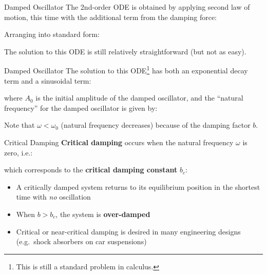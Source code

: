 \documentclass[12pt,compress,aspectratio=169]{beamer}
\begin{document}
\begin{frame}{Damped Oscillator}
  The 2nd-order ODE is obtained by applying second law of motion, this time
  with the additional term from the damping force:


  Arranging into standard form:
  

  The solution to this ODE is still relatively straightforward (but not as
  easy).
\end{frame}



\begin{frame}{Damped Oscillator}
  The solution to this ODE\footnote{This is still a standard problem in
    calculus.} has both an {\color{red}exponential decay term} and a
  {\color{blue}sinusoidal term}:


  \vspace{-.1in}where $A_0$ is the initial amplitude of the damped oscillator,
  and the ``natural frequency'' for the damped oscillator is given by:

  
  Note that $\omega<\omega_0$ (natural frequency decreases) because of the
  damping factor $b$.
  \vspace{.2in}
\end{frame}



\begin{frame}{Critical Damping}
  \textbf{Critical damping} occurs when the natural frequency $\omega$ is zero,
  i.e.:
  

  which corresponds to the \textbf{critical damping constant} $b_c$:

  \begin{itemize}
  \item A critically damped system returns to its equilibrium
    position in the shortest time with \emph{no} oscillation
  \item When $b>b_c$, the system is \textbf{over-damped}
  \item Critical or near-critical damping is desired in many engineering designs
    (e.g.\ shock absorbers on car suspensions)
  \end{itemize}
\end{frame}
\end{document}
